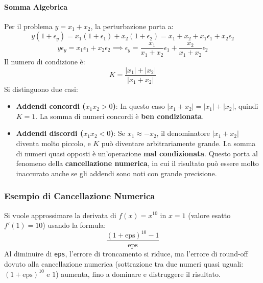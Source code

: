 \paragraph{Somma Algebrica}
Per il problema $y = x_1 + x_2$, la perturbazione porta a:
$$ y(1+\epsilon_y) = x_1(1+\epsilon_1) + x_2(1+\epsilon_2) = x_1+x_2 + x_1\epsilon_1 + x_2\epsilon_2 $$
$$ y\epsilon_y = x_1\epsilon_1 + x_2\epsilon_2 \implies \epsilon_y = \frac{x_1}{x_1+x_2}\epsilon_1 + \frac{x_2}{x_1+x_2}\epsilon_2 $$
Il numero di condizione è:
$$ K = \frac{|x_1| + |x_2|}{|x_1+x_2|} $$
Si distinguono due casi:
\begin{itemize}
    \item \textbf{Addendi concordi ($x_1 x_2 > 0$)}: In questo caso $|x_1+x_2| = |x_1|+|x_2|$, quindi $K=1$. La somma di numeri concordi è \textbf{ben condizionata}.
    \item \textbf{Addendi discordi ($x_1 x_2 < 0$)}: Se $x_1 \approx -x_2$, il denominatore $|x_1+x_2|$ diventa molto piccolo, e $K$ può diventare arbitrariamente grande. La somma di numeri quasi opposti è un'operazione \textbf{mal condizionata}. Questo porta al fenomeno della \textbf{cancellazione numerica}, in cui il risultato può essere molto inaccurato anche se gli addendi sono noti con grande precisione.
\end{itemize}

\subsubsection*{Esempio di Cancellazione Numerica}

Si vuole approssimare la derivata di $f(x) = x^{10}$ in $x=1$ (valore esatto $f'(1)=10$) usando la formula:
$$ \frac{(1+\text{eps})^{10} - 1}{\text{eps}} $$
Al diminuire di \texttt{eps}, l'errore di troncamento si riduce, ma l'errore di round-off dovuto alla cancellazione numerica (sottrazione tra due numeri quasi uguali: $(1+\text{eps})^{10}$ e $1$) aumenta, fino a dominare e distruggere il risultato.

